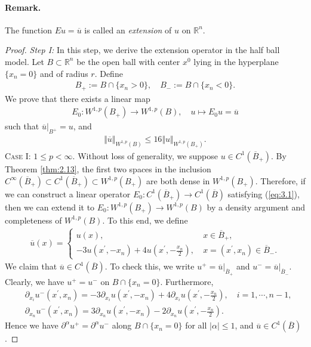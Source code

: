 \documentclass{article}
\numberwithin{equation}{section}
\newcommand{\bbR}{\mathbb{R}}
\newcommand{\ol}{\overline}
\theoremstyle{plain}
\theoremstyle{definition}
\begin{document}
\paragraph{Remark.} The function $Eu=\ol{u}$ is called an \textit{extension} of $u$ on $\bbR^n$.
\begin{proof}
\textit{Step I:} In this step, we derive the extension operator in the half ball model. Let $B\subset\bbR^n$ be the open ball with center $x^0$ lying in the hyperplane $\{x_n=0\}$ and of radius $r$. Define
\begin{align*}
	B_+:=B\cap\{x_n>0\},\quad B_-:=B\cap\{x_n<0\}.
\end{align*}
We prove that there exists a linear map
\begin{align*}
	E_0:W^{1,p}(B_+)\to W^{1,p}(B),\quad u\mapsto E_0u=\ol{u}
\end{align*}
such that $\ol{u}|_{B^+}=u$, and
\begin{align}
	\Vert\ol{u}\Vert_{W^{1,p}(B)}\leq 16\Vert u\Vert_{W^{1,p}(B_+)}.\label{eq:3.1}
\end{align}
\textsc{Case I: $1\leq p<\infty$.} Without loss of generality, we suppose $u\in C^1(\ol{B}_+)$. By Theorem \ref{thm:2.13}, the first two spaces in the inclusion $C^\infty(\ol{B}_+)\subset C^1(\ol{B}_+)\subset W^{1,p}(B_+)$ are both dense in $W^{1,p}(B_+)$. Therefore, if we can construct a linear operator $E_0:C^1(\ol{B}_+)\to C^1(\ol{B})$ satisfying (\ref{eq:3.1}), then we can extend it to $E_0:W^{1,p}(B_+)\to W^{1,p}(B)$ by a density argument and completeness of $W^{1,p}(B)$. To this end, we define
\begin{align*}
	\ol{u}(x)=\begin{cases}
		u(x),\ &x\in\ol{B}_+,\\
		-3u(x^\prime,-x_n)+4u(x^\prime,-\frac{x_n}{2}),\ &x=(x^\prime,x_n)\in \ol{B}_-.
	\end{cases}
\end{align*}
We claim that $\ol{u}\in C^1(\ol{B})$. To check this, we write $u^+=\ol{u}|_{\ol{B}_+}$ and $u^-=\ol{u}|_{\ol{B}_-}$. Clearly, we have $u^+=u^-$ on $B\cap\{x_n=0\}$. Furthermore,
\begin{align*}
	&\partial_{x_i}u^-(x^\prime,x_n)=-3\partial_{x_i}u(x^\prime,-x_n)+4\partial_{x_i}u(x^\prime,-\frac{x_n}{2}),\quad i=1,\cdots,n-1,\\
	&\partial_{x_n}u^-(x^\prime,x_n)=3\partial_{x_n}u(x^\prime,-x_n)-2\partial_{x_n}u(x^\prime,-\frac{x_n}{2}).
\end{align*}
Hence we have $\partial^\alpha u^+=\partial^\alpha u^-$ along $B\cap\{x_n=0\}$ for all $\vert\alpha\vert\leq 1$, and $\overline{u}\in C^1(\ol{B})$.


\end{proof}
\end{document}
